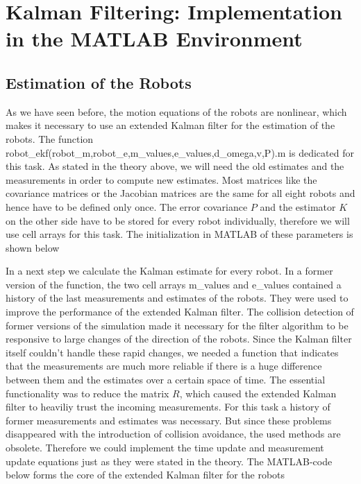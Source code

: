 
\chapter{Kalman Filtering: Implementation in the MATLAB Environment}

\section{Estimation of the Robots}

As we have seen before, the motion equations of the robots are nonlinear, which makes it necessary to use an extended Kalman filter for the estimation of the robots. The function {\selectfont robot\_ekf(robot\_m,robot\_e,m\_values,e\_values,d\_omega,v,P).m} is dedicated for this task. As stated in the theory above, we will need the old estimates and the measurements in order to compute new estimates. Most matrices like the covariance matrices or the Jacobian matrices are the same for all eight robots and hence have to be defined only once. The error covariance \(P\) and the estimator \(K\) on the other side have to be stored for every robot individually, therefore we will use cell arrays for this task. The initialization in MATLAB of these parameters is shown below


\parskip 20pt

In a next step we calculate the Kalman estimate for every robot. In a former version of the function, the two cell arrays {\selectfont m\_values} and {\selectfont e\_values} contained a history of the last measurements and estimates of the robots. They were used to improve the performance of the extended Kalman filter. The collision detection of former versions of the simulation made it necessary for the filter algorithm to be responsive to large changes of the direction of the robots. Since the Kalman filter itself couldn't handle these rapid changes, we needed a function that indicates that the measurements are much more reliable if there is a huge difference between them and the estimates over a certain space of time. The essential functionality was  to reduce the matrix \(R\), which caused the extended Kalman filter to heaviliy trust the incoming measurements. For this task a history of former measurements and estimates was necessary. But since these problems disappeared with the introduction of collision avoidance, the used methods are obsolete. Therefore we could implement the time update and measurement update equations just as they were stated in the theory. The MATLAB-code below forms the core of the extended Kalman filter for the robots

